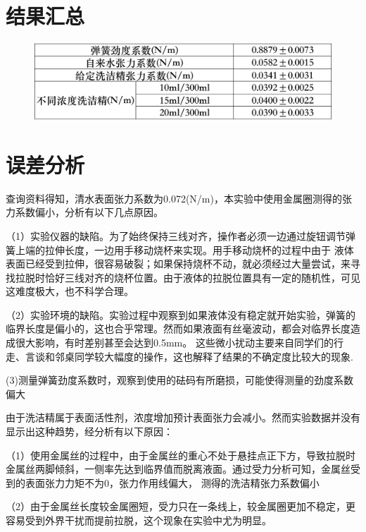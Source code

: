 \documentclass[UTF8]{ctexart}
\begin{document}
    \section{结果汇总}

    \begin{figure}[ht]
        \centering
        \includegraphics[width=13cm]{结果汇总.png}
    \end{figure}
    


    \section{误差分析}
    查询资料得知，清水表面张力系数为0.072(N/m)，本实验中使用金属圈测得的张力系数偏小，分析有以下几点原因。

    （1）实验仪器的缺陷。为了始终保持三线对齐，操作者必须一边通过旋钮调节弹簧上端的拉伸长度，一边用手移动烧杯来实现。用手移动烧杯的过程中由于
    液体表面已经受到拉伸，很容易破裂；如果保持烧杯不动，就必须经过大量尝试，来寻找拉脱时恰好三线对齐的烧杯位置。由于液体的拉脱位置具有一定的随机性，可见这难度极大，也不科学合理。
    
    （2）实验环境的缺陷。实验过程中观察到如果液体没有稳定就开始实验，弹簧的临界长度是偏小的，这也合乎常理。然而如果液面有丝毫波动，都会对临界长度造成很大影响，有时差别甚至会达到0.5mm。
    这些微小扰动主要来自同学们的行走、言谈和邻桌同学较大幅度的操作，这也解释了结果的不确定度比较大的现象.

    (3)测量弹簧劲度系数时，观察到使用的砝码有所磨损，可能使得测量的劲度系数偏大

     由于洗洁精属于表面活性剂，浓度增加预计表面张力会减小。然而实验数据并没有显示出这种趋势，经分析有以下原因：

    （1）使用金属丝的过程中，由于金属丝的重心不处于悬挂点正下方，导致拉脱时金属丝两脚倾斜，一侧率先达到临界值而脱离液面。通过受力分析可知，金属丝受到的表面张力力矩不为0，张力作用线偏大，
    测得的洗洁精张力系数偏小

    （2）由于金属丝长度较金属圈短，受力只在一条线上，较金属圈更加不稳定，更容易受到外界干扰而提前拉脱，这个现象在实验中尤为明显。
    
\end{document}
